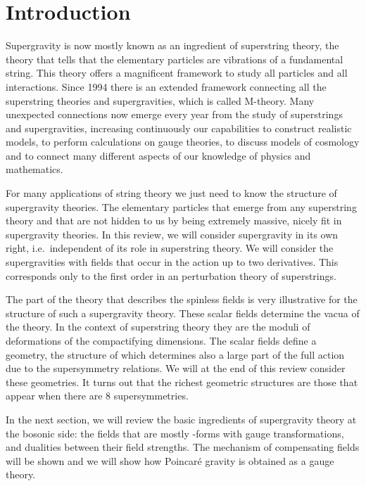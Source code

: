 \documentclass[a4paper,11pt,twoside]{article}
\begin{document}
%
%
\tableofcontents
\section{Introduction}

Supergravity is now mostly known as an ingredient of superstring theory,
the theory that tells that the elementary particles are vibrations of a
fundamental string. This theory offers a magnificent framework to study
all particles and all interactions. Since 1994 there is an extended
framework connecting all the superstring theories and supergravities,
which is called M-theory. Many unexpected connections now emerge every
year from the study of superstrings and supergravities, increasing
continuously our capabilities to construct realistic models, to perform
calculations on gauge theories, to discuss models of cosmology and to
connect many different aspects of our knowledge of physics and
mathematics.

For many applications of string theory we just need to know the structure
of supergravity theories. The elementary particles that emerge from any
superstring theory and that are not hidden to us by being extremely
massive, nicely fit in supergravity theories. In this review, we will
consider supergravity in its own right, i.e.\ independent of its role in
superstring theory. We will consider the supergravities with fields that
occur in the action up to two derivatives. This corresponds only to the
first order in an \coordHE{} perturbation theory of superstrings.

The part of the theory that describes the spinless fields is very
illustrative for the structure of such a supergravity theory. These
scalar fields determine the vacua of the theory. In the context of
superstring theory they are the moduli of deformations of the
compactifying dimensions. The scalar fields define a geometry, the
structure of which determines also a large part of the full action due to
the supersymmetry relations. We will at the end of this review consider
these geometries. It turns out that the richest geometric structures are
those that appear when there are 8 supersymmetries.

In the next section, we will review the basic ingredients of supergravity
theory at the bosonic side: the fields that are mostly \coordHE{}-forms with
gauge transformations, and dualities between their field strengths. The
mechanism of compensating fields will be shown and we will show how
Poincar{\'e} gravity is obtained as a gauge theory.
\end{document}
